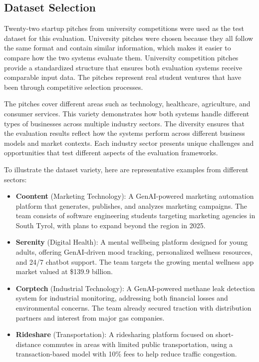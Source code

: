 \subsection{Dataset Selection}
\label{subsec:dataset}

Twenty-two startup pitches from university competitions were used as the test dataset for this evaluation. University pitches were chosen because they all follow the same format and contain similar information, which makes it easier to compare how the two systems evaluate them. University competition pitches provide a standardized structure that ensures both evaluation systems receive comparable input data. The pitches represent real student ventures that have been through competitive selection processes.

The pitches cover different areas such as technology, healthcare, agriculture, and consumer services. This variety demonstrates how both systems handle different types of businesses across multiple industry sectors. The diversity ensures that the evaluation results reflect how the systems perform across different business models and market contexts. Each industry sector presents unique challenges and opportunities that test different aspects of the evaluation frameworks.

To illustrate the dataset variety, here are representative examples from different sectors:

\begin{itemize}
    \item \textbf{Coontent} (Marketing Technology): A GenAI-powered marketing automation platform that generates, publishes, and analyzes marketing campaigns. The team consists of software engineering students targeting marketing agencies in South Tyrol, with plans to expand beyond the region in 2025.

    \item \textbf{Serenity} (Digital Health): A mental wellbeing platform designed for young adults, offering GenAI-driven mood tracking, personalized wellness resources, and 24/7 chatbot support. The team targets the growing mental wellness app market valued at \$139.9 billion.

    \item \textbf{Corptech} (Industrial Technology): A GenAI-powered methane leak detection system for industrial monitoring, addressing both financial losses and environmental concerns. The team already secured traction with distribution partners and interest from major gas companies.

    \item \textbf{Rideshare} (Transportation): A ridesharing platform focused on short-distance commutes in areas with limited public transportation, using a transaction-based model with 10\% fees to help reduce traffic congestion.
\end{itemize}


